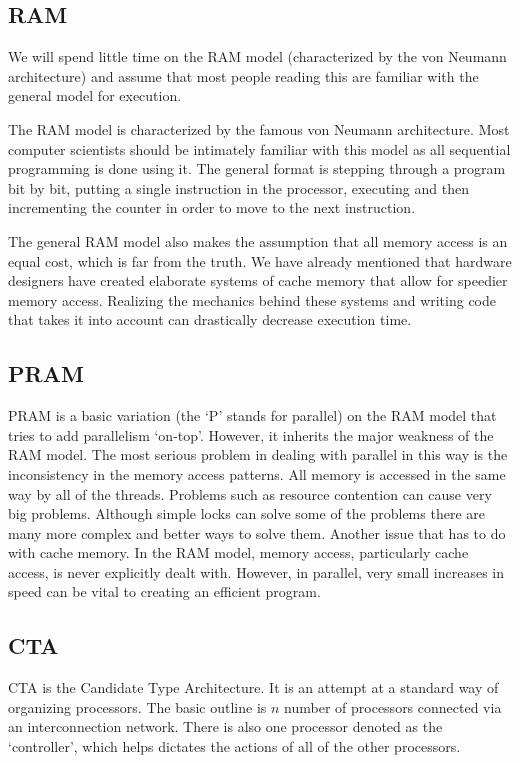 \documentclass{article}
\begin{document}
    \subsection{RAM}
    We will spend little time on the RAM model (characterized by the von Neumann architecture) and assume that most people reading this are familiar with the general model for execution.
	
	The RAM model is characterized by the famous von Neumann architecture. Most computer scientists should be intimately familiar with this model as all sequential programming is done using it. The general format is stepping through a program bit by bit, putting a single instruction in the processor, executing and then incrementing the counter in order to move to the next instruction.
	
	The general RAM model also makes the assumption that all memory access is an equal cost, which is far from the truth. We have already mentioned that hardware designers have created elaborate systems of cache memory that allow for speedier memory access. Realizing the mechanics behind these systems and writing code that takes it into account can drastically decrease execution time.
	
    \subsection{PRAM}
      PRAM is a basic variation (the `P' stands for parallel) on the RAM model that tries to add parallelism `on-top'. However, it inherits the major weakness of the RAM model. The most serious problem in dealing with parallel in this way is the inconsistency in the memory access patterns. All memory is accessed in the same way by all of the threads. Problems such as resource contention can cause very big problems. Although simple locks can solve some of the problems there are many more complex and better ways to solve them. Another issue that has to do with cache memory. In the RAM model, memory access, particularly cache access, is never explicitly dealt with. However, in parallel, very small increases in speed can be vital to creating an efficient program.
    \subsection{CTA}
    CTA is the Candidate Type Architecture. It is an attempt at a standard way of organizing processors. The basic outline is $n$ number of processors connected via an interconnection network. There is also one processor denoted as the `controller', which helps dictates the actions of all of the other processors.
	
\end{document}
